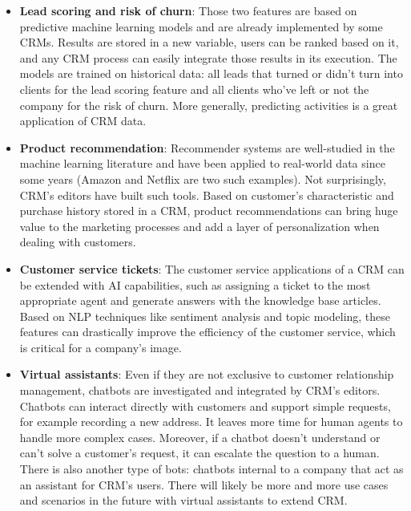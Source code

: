 \begin{itemize}
    \item \textbf{Lead scoring and risk of churn}: Those two features are based on predictive machine learning models and are already implemented by some CRMs. Results are stored in a new variable, users can be ranked based on it, and any CRM process can easily integrate those results in its execution. The models are trained on historical data: all leads that turned or didn't turn into clients for the lead scoring feature and all clients who've left or not the company for the risk of churn. More generally, predicting activities is a great application of CRM data.
    \item \textbf{Product recommendation}: Recommender systems are well-studied in the machine learning literature and have been applied to real-world data since some years (Amazon and Netflix are two such examples). Not surprisingly, CRM's editors have built such tools. Based on customer's characteristic and purchase history stored in a CRM, product recommendations can bring huge value to the marketing processes and add a layer of personalization when dealing with customers.
    \item \textbf{Customer service tickets}: The customer service applications of a CRM can be extended with AI capabilities, such as assigning a ticket to the most appropriate agent and generate answers with the knowledge base articles. Based on NLP techniques like sentiment analysis and topic modeling, these features can drastically improve the efficiency of the customer service, which is critical for a company's image.
    \item \textbf{Virtual assistants}: Even if they are not exclusive to customer relationship management, chatbots are investigated and integrated by CRM's editors. Chatbots can interact directly with customers and support simple requests, for example recording a new address. It leaves more time for human agents to handle more complex cases. Moreover, if a chatbot doesn't understand or can't solve a customer's request, it can escalate the question to a human. There is also another type of bots: chatbots internal to a company that act as an assistant for CRM's users. There will likely be more and more use cases and scenarios in the future with virtual assistants to extend CRM.
\end{itemize}

